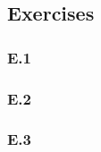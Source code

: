 \documentclass[]{article}
\begin{document}
\subsection*{Exercises} 

\subsubsection*{E.1}

\subsubsection*{E.2}

\subsubsection*{E.3} 

\printbibliography
\end{document}
